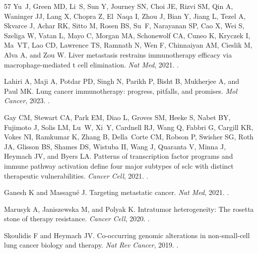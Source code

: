 \documentclass[11pt]{article}
\begin{document}
\begin{thebibliography}{57}
Yu~J, Green MD, Li~S, Sun Y, Journey SN, Choi JE, Rizvi SM, Qin A, Waninger JJ,
  Lang X, Chopra Z, El~Naqa I, Zhou J, Bian Y, Jiang L, Tezel A, Skvarce J,
  Achar RK, Sitto M, Rosen BS, Su~F, Narayanan SP, Cao X, Wei S, Szeliga W,
  Vatan L, Mayo C, Morgan MA, Schonewolf CA, Cuneo K, Kryczek I, Ma~VT, Lao CD,
  Lawrence TS, Ramnath N, Wen F, Chinnaiyan AM, Cieslik M, Alva A, and Zou W.
\newblock Liver metastasis restrains immunotherapy efficacy via
  macrophage-mediated t cell elimination.
\newblock \emph{Nat Med}, 2021.
\newblock {}.

Lahiri A, Maji A, Potdar PD, Singh N, Parikh P, Bisht B, Mukherjee A, and Paul
  MK.
\newblock Lung cancer immunotherapy: progress, pitfalls, and promises.
\newblock \emph{Mol Cancer}, 2023.
\newblock {}.

Gay CM, Stewart CA, Park EM, Diao L, Groves SM, Heeke S, Nabet BY, Fujimoto J,
  Solis LM, Lu~W, Xi~Y, Cardnell RJ, Wang Q, Fabbri G, Cargill KR, Vokes NI,
  Ramkumar K, Zhang B, Della~Corte CM, Robson P, Swisher SG, Roth JA, Glisson
  BS, Shames DS, Wistuba II, Wang J, Quaranta V, Minna J, Heymach JV, and Byers
  LA.
\newblock Patterns of transcription factor programs and immune pathway
  activation define four major subtypes of sclc with distinct therapeutic
  vulnerabilities.
\newblock \emph{Cancer Cell}, 2021.
\newblock {}.

Ganesh K and Massagué J.
\newblock Targeting metastatic cancer.
\newblock \emph{Nat Med}, 2021.
\newblock {}.

Marusyk A, Janiszewska M, and Polyak K.
\newblock Intratumor heterogeneity: The rosetta stone of therapy resistance.
\newblock \emph{Cancer Cell}, 2020.
\newblock {}.

Skoulidis F and Heymach JV.
\newblock Co-occurring genomic alterations in non-small-cell lung cancer
  biology and therapy.
\newblock \emph{Nat Rev Cancer}, 2019.
\newblock {}.


\end{thebibliography}
\end{document}
